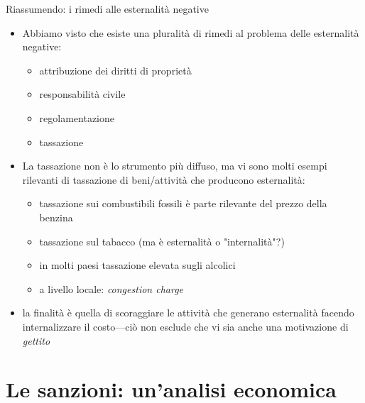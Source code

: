 \documentclass[aspectratio=64,11pt]{beamer}
\begin{document}
\begin{frame}{Riassumendo: i rimedi alle esternalità negative}
\begin{itemize}
\item Abbiamo visto che esiste una pluralità di rimedi al problema delle esternalità negative:
\begin{itemize}
\item attribuzione dei diritti di proprietà
\item responsabilità civile
\item regolamentazione
\item tassazione
\end{itemize}
\item La tassazione non è lo strumento più diffuso, ma vi sono molti esempi rilevanti di tassazione di beni/attività che producono esternalità:
\begin{itemize}
\item tassazione sui combustibili fossili è parte rilevante del prezzo della
benzina
\item tassazione sul tabacco (ma è esternalità o "internalità"?)
\item in molti paesi tassazione elevata sugli alcolici
\item a livello locale: \emph{congestion charge}
\end{itemize}
\item la finalità è quella di scoraggiare le attività che generano esternalità facendo internalizzare il costo---ciò non esclude che vi sia anche una motivazione di \emph{gettito}
\end{itemize}
\end{frame}

\section{Le sanzioni: un'analisi economica}
\end{document}

